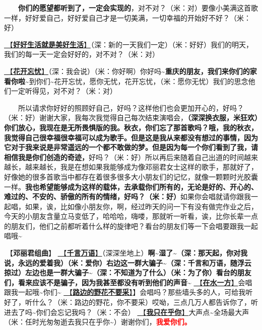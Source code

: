\documentclass[]{ctexbook}
\begin{document}
  \textbf{你们的愿望都听到了，一定会实现的}，对不对？（米：对）要像小美满这首歌一样，好好爱自己，好好爱自己才是一切美满，一切幸福的开始好不好？（米：好）

\hyperref[live-happy-life-happy]{🎵【\textbf{好好生活就是美好生活}】}（深：新的一天我们一定）（米：好好）我们的明天，我们的每一天一定会好好的，对不对？（米：对）

\hyperref[no-worries]{🎵【\textbf{花开忘忧}】}（深：我会说）（米：你好啊）你好吗\textasciitilde{}\textbf{重庆的朋友，我们来你们的家看你啦\textasciitilde{}}到你们\textasciitilde 花开忘忧，愿你无忧，花开忘忧，（米：愿你无忧）我们的思念他们一定听得见，对不对？（米：对）

  所以请求你好好的照顾好自己，好吗？这样他们也会更加开心的，好吗？（米：好）谢谢大家，我每次我觉得自己每次结束演唱会，\textbf{（深深换衣服，米狂欢）你们放心，我现在是无所畏惧版的我。秋衣，你们忘了那首歌吗？哦，我的秋衣，我觉得自己很幸福很幸福可以成为歌手。但是这是我从来都没有想过的事情，因为它对于我来说是非常遥远的一个都不敢做的梦。但是因为每一个你们看到了我，请相信我是你们创造的奇迹，}好吗？（米：好）所以再后来随着自己出道的时间越来越长，越来越长，我是在想如果我能够成为像邓丽君女士这样的歌手，那就好了，好像她的很多首歌当中都存在着很多很多大小朋友们的记忆，就像一颗颗时光胶囊一样。\textbf{我也希望能够成为这样的载体，去承载你们所有的，无论是好的、开心的、难过的、不安的、骄傲的所有的情绪，好吗？（米：好）}如果你会唱就请你跟我一起唱，如果，诶，比如像小朋友你，啊，经过昨天的问一下有没有做完作业之后，今天的小朋友含量立马变低了，哈哈哈，嗨喽，那就听一听看，诶，比你长辈一点的朋友们，他们之前都听着什么样的旋律吧？看台的朋友们等一下会唱要跟我一起唱哦\textasciitilde{}

🎵【\textbf{邓丽君组曲}】
\hyperref[thousands-of-words]{🎵【\textbf{千言万语}】}（深深坐地上）\textbf{啊\textasciitilde 湿了\textasciitilde（深：那天起，你对我说，永远的爱着我）（米：爱你）右边这一群大骗子\textasciitilde（深：千言和万语，随浮云掠过）左边也是一群大骗子\textasciitilde（深：不知道为了什么）（米：为了你）看台的朋友们，看来应该不是骗子，因为我甚至都没有听到他们的声音\textasciitilde{}}
\hyperref[on-the-water-side]{🎵【\textbf{在水一方}】}会唱跟我一起哦\textasciitilde 你们\textasciitilde{}
\hyperref[only-with-me]{🎵【\textbf{路边的野花不要采}】}】会唱吗？那些墙头多的人，可给我听好了，听什么？（米：路边的野花，你不要采）哎呦，三点几万人都告诉你了，听进去了吗\textasciitilde 你们会忘记我吗？（米：不会）
\hyperref[only-you]{🎵【\textbf{我只在乎你}】}大声点\textasciitilde 全场最大声（米：任时光匆匆逝去我只在乎你\textasciitilde）谢谢你们，\textbf{\textcolor{red}{我爱你们。}}
\end{document}
